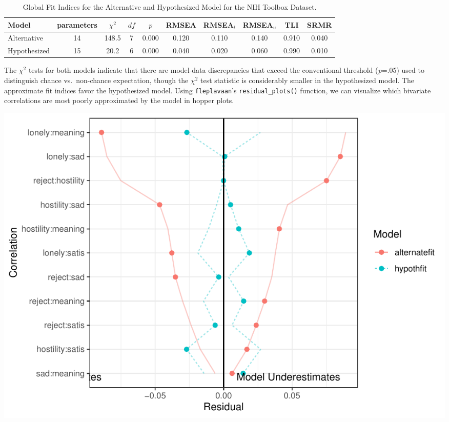 \documentclass[
  english,
  doc]{apa6}
\begin{document}
\begin{table}[tbp]

\begin{center}
\begin{threeparttable}

\caption{\label{tab:unnamed-chunk-2}Global Fit Indices for the Alternative and Hypothesized Model for the NIH Toolbox Dataset.}

\begin{tabular}{lccccccccc}
\toprule
Model & parameters & $\chi^2$ & $df$ & $p$ & RMSEA & RMSEA$_{l}$ & RMSEA$_{u}$ & TLI & SRMR\\
\midrule
Alternative & 14 & 148.5 & 7 & 0.000 & 0.120 & 0.110 & 0.140 & 0.910 & 0.040\\
Hypothesized & 15 & 20.2 & 6 & 0.000 & 0.040 & 0.020 & 0.060 & 0.990 & 0.010\\
\bottomrule
\end{tabular}

\end{threeparttable}
\end{center}

\end{table}

The \(\chi^2\) tests for both models indicate that there are model-data discrepancies that exceed the conventional threshold (\emph{p}=.05) used to distinguish chance vs.~non-chance expectation, though the \(\chi^2\) test statistic is considerably smaller in the hypothesized model. The approximate fit indices favor the hypothesized model.
Using \texttt{fleplavaan}'s \texttt{residual\_plots()} function, we can visualize which bivariate correlations are most poorly approximated by the model in hopper plots.

\includegraphics{flexplavaan_draft_files/figure-latex/unnamed-chunk-3-1.pdf}
\end{document}

